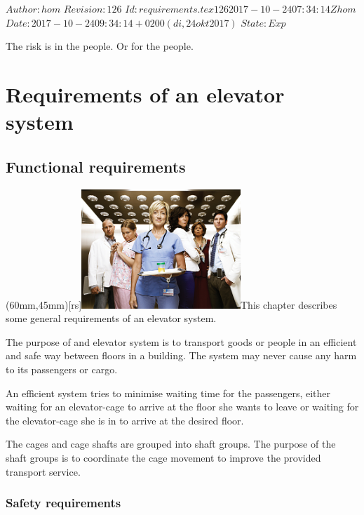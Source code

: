 \renewcommand\TheFile{requirements.tex}
\SVN $Author: hom $
\SVN $Revision: 126 $
\SVN $Id: requirements.tex 126 2017-10-24 07:34:14Z hom $
\SVN $Date: 2017-10-24 09:34:14 +0200 (di, 24 okt 2017) $
\SVN $State: Exp $
\begin{savequote}[8cm]
  \sffamily
  The risk is in the people. Or for the people.
\end{savequote}

\chapter{Requirements of an elevator system}
\section{Functional requirements}
\parpic(60mm,45mm)[rs]{\includegraphics[width=60mm]{figures/nurse_jackie_gal2_pr01_elevator.jpg}}This chapter describes some general requirements of an elevator
system.
 
The purpose of and elevator system is to transport goods or people in
an efficient and safe way between floors in a building. The system
may never cause any harm to its passengers or cargo.

An efficient system tries to minimise waiting time for the passengers,
either waiting for an elevator-cage to arrive at the floor she wants
to leave or waiting for the elevator-cage she is in to arrive at the 
desired floor.

The cages and cage shafts are grouped into shaft groups. The purpose of
the shaft groups is to coordinate the cage movement to improve the
provided transport service.

\subsection{Safety requirements}

